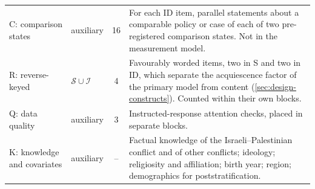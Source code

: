 \begin{table}[tb]
\begin{tabularx}{\textwidth}{@{}>{\raggedright\arraybackslash}p{2.6cm}>{\raggedright\arraybackslash}p{1.9cm}c>{\raggedright\arraybackslash}X@{}}
\addlinespace
C: comparison states & auxiliary & 16 & For each ID item, parallel statements about a comparable policy or case of each of two pre-registered comparison states. Not in the measurement model. \\
\addlinespace
R: reverse-keyed & $\mathcal{S}\cup\mathcal{I}$ & 4 & Favourably worded items, two in S and two in ID, which separate the acquiescence factor of the primary model from content (\cref{sec:design-constructs}). Counted within their own blocks. \\
\addlinespace
Q: data quality & auxiliary & 3 & Instructed-response attention checks, placed in separate blocks. \\
\addlinespace
K: knowledge and covariates & auxiliary & -- & Factual knowledge of the Israeli--Palestinian conflict and of other conflicts; ideology; religiosity and affiliation; birth year; region; demographics for poststratification. \\
\bottomrule
\end{tabularx}
\end{table}

